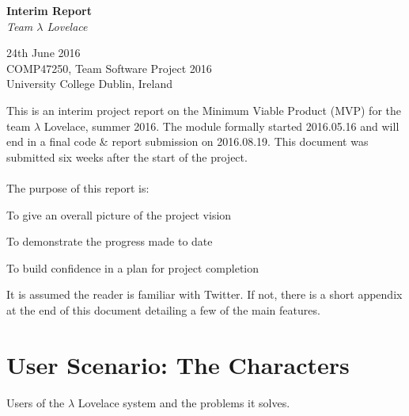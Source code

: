 \documentclass{article}
\begin{document}
\begin{center}
	{\LARGE \textbf{Interim Report}} \\
	\vspace{0.5em}
	\textsl{Team $\lambda$ Lovelace}
\end{center}

\vspace{0.5em}

\begin{center}
	24th June 2016 \\
	COMP47250, Team Software Project 2016 \\ 
	University College Dublin, Ireland \\
\end{center}

\vspace{0.5em}



\noindent This is an interim project report on the Minimum Viable Product (MVP) for the team $\lambda$ Lovelace, summer 2016. The module formally started 2016.05.16 and will end in a final code \& report submission on 2016.08.19. This document was submitted six weeks after the start of the project.
\\\\
The purpose of this report is:

\begin{itemize*}
    \item To give an overall picture of the project vision
    \item To demonstrate the progress made to date
    \item To build confidence in a plan for project completion
\end{itemize*}

\noindent It is assumed the reader is familiar with Twitter. If not, there is a short appendix at the end of this document detailing a few of the main features.


\section{User Scenario: The Characters}
Users of the $\lambda$ Lovelace system and the problems it solves.
\end{document}
